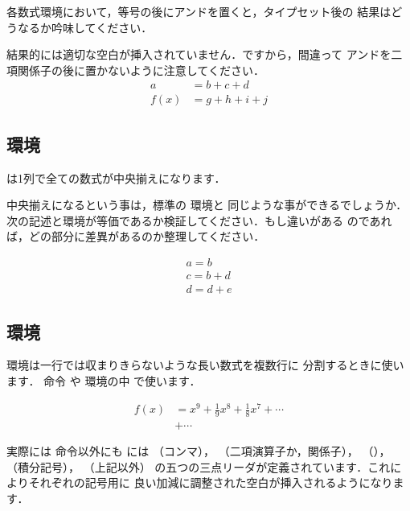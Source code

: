 各数式環境において，等号の後にアンドを置くと，タイプセット後の
結果はどうなるか吟味してください．

結果的には適切な空白が挿入されていません．ですから，間違って
アンドを二項関係子の後に置かないように注意してください．
 \begin{align}
  a    &=  b + c + d \\
  f(x) &=  g + h + i + j
 \end{align}  


\subsection{環境}

は1列で全ての数式が中央揃えになります．

中央揃えになるという事は，\LaTeXe 標準の 環境と
同じような事ができるでしょうか．
次の記述と環境が等価であるか検証してください．もし違いがある
のであれば，どの部分に差異があるのか整理してください．

\begin{intext}
\begin{eqnarray*}
& a = b & \\
& c = b + d & \\
& d = d + e & 
\end{eqnarray*}
\end{intext}

\subsection{環境}

環境は一行では収まりきらないような長い数式を複数行に
分割するときに使います． 命令 や 環境の中
で使います．

\begin{inout}
\begin{displaymath}
 \begin{split}
  f(x) & = x^9 + \frac{1}{9}x^8 + 
     \frac{1}{8}x^7 + \cdots\\
  & + \cdots
 \end{split}
\end{displaymath}
\end{inout}

実際には  命令以外にも \AmSLaTeX には （コンマ），
（二項演算子か，関係子），
（），
（積分記号），
（上記以外）
の五つの三点リーダが定義されています．これによりそれぞれの記号用に
良い加減に調整された空白が挿入されるようになります．


